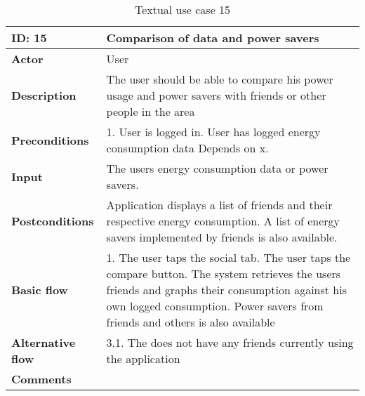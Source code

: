 \begin{table}[H]
\begin{tabular}{|l|p{11.7cm}|}
\hline
\textbf{ID: }15&\textbf{Comparison of data and power savers}
\\\hline
\textbf{Actor} &User
\\\hline
\textbf{Description}&
The user should be able to compare his power usage and power savers with friends or other people in the area\\\hline
\textbf{Preconditions}&
1. User is logged in\newline
2. User has logged energy consumption data\newline
Depends on x.\\\hline
\textbf{Input}&
The users energy consumption data or power savers.\\\hline
\textbf{Postconditions}& 
Application displays a list of friends and their respective energy consumption. A list of energy savers implemented by friends is also available. \\\hline
\textbf{Basic flow}&
1. The user taps the social tab\newline
2. The user taps the compare button\newline
3. The system retrieves the users friends and graphs their consumption against his own logged consumption\newline
4. Power savers from friends and others is also available
\\\hline
\textbf{Alternative flow}&
3.1. The does not have any friends currently using the application
\\\hline
\textbf{Comments}& \\\hline
\end{tabular}
\caption{Textual use case 15}
\end{table}

